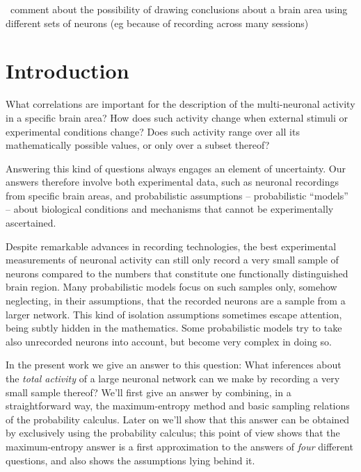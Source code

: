 \documentclass[\ifafour a4paper,12pt,\else a5paper,10pt,\fi%
onecolumn,oneside,article,%
british%
]{memoir}
\theoremstyle{remark}
\theoremstyle{innote}
\renewcommand*{\|}{\nonscript\,\vert\nonscript\;\mathopen{}}
\newcommand*{\puzzle}{{\fontencoding{U}\fontfamily{fontawesometwo}\selectfont\symbol{225}}}
\newcommand{\mynote}[1]{ {\color{notecolour}\puzzle\ #1}}
\begin{document}

\mynote{comment about the possibility of drawing conclusions about a brain
  area using different sets of neurons (eg because of recording across many
  sessions)}


\section{Introduction}
\label{sec:intro}

What correlations are important for the description of the multi-neuronal
activity in a specific brain area? How does such activity change when
external stimuli or experimental conditions change? Does such activity
range over all its mathematically possible values, or only over a
subset thereof? 

Answering this kind of questions always engages an element of uncertainty.
Our answers therefore involve both experimental data, such as neuronal
recordings from specific brain areas, and probabilistic assumptions --
probabilistic \enquote{models} -- about biological conditions and
mechanisms that cannot be experimentally ascertained.

Despite remarkable advances in recording technologies, the best
experimental measurements of neuronal activity can still only record a very
small sample of neurons compared to the numbers that constitute one
functionally distinguished brain region. Many probabilistic models focus on
such samples only, somehow neglecting, in their assumptions, that the
recorded neurons are a sample from a larger network. This kind of isolation
assumptions sometimes escape attention, being subtly hidden in the
mathematics. Some probabilistic models try to take also unrecorded neurons
into account, but become very complex in doing so.

In the present work we give an answer to this question: What inferences
about the \emph{total activity} of a large neuronal network can we make by
recording a very small sample thereof? We'll first give an answer by
combining, in a straightforward way, the maximum-entropy method and basic
sampling relations of the probability calculus. Later on we'll show that
this answer can be obtained by exclusively using the probability calculus;
this point of view shows that the maximum-entropy answer is a first
approximation to the answers of \emph{four} different questions, and also
shows the assumptions lying behind it.
\end{document}
